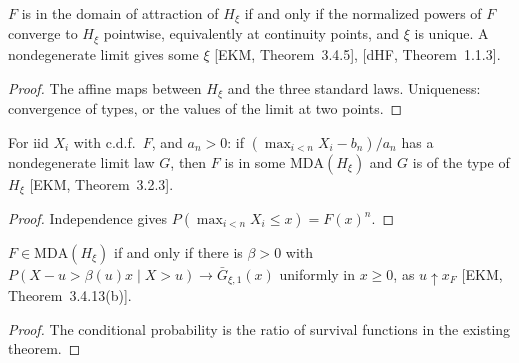 \begin{theorem}
  \label{thm:mda-gev-link}
  \leanok
  $F$ is in the domain of attraction of $H_\xi$ if and only if the normalized powers of $F$ converge to
  $H_\xi$ pointwise, equivalently at continuity points, and $\xi$ is unique. A nondegenerate limit gives some
  $\xi$ [EKM, Theorem~3.4.5], [dHF, Theorem~1.1.3].
\end{theorem}
\begin{proof}
  \leanok
  The affine maps between $H_\xi$ and the three standard laws. Uniqueness: convergence of types, or the
  values of the limit at two points.
\end{proof}

\begin{theorem}
  \label{thm:ftg-sample-maxima}
  \leanok
  For iid $X_i$ with c.d.f.\ $F$, and $a_n > 0$: if $(\max_{i < n} X_i - b_n)/a_n$ has a nondegenerate limit law
  $G$, then $F$ is in some $\mathrm{MDA}(H_\xi)$ and $G$ is of the type of $H_\xi$
  [EKM, Theorem~3.2.3].
\end{theorem}
\begin{proof}
  \leanok
  Independence gives $P(\max_{i < n} X_i \le x) = F(x)^n$.
\end{proof}

\begin{theorem}
  \label{thm:pbdh-conditional}
  \leanok
  $F \in \mathrm{MDA}(H_\xi)$ if and only if there is $\beta > 0$ with
  $P(X - u > \beta(u) x \mid X > u) \to \bar G_{\xi, 1}(x)$ uniformly in $x \ge 0$, as $u \uparrow x_F$
  [EKM, Theorem~3.4.13(b)].
\end{theorem}
\begin{proof}
  \leanok
  The conditional probability is the ratio of survival functions in the existing theorem.
\end{proof}

